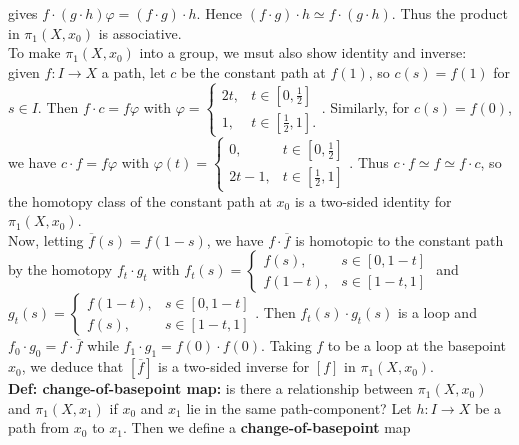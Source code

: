 \documentclass[a4paper]{article}
\begin{document}
gives $f \cdot \left( g\cdot h \right) \varphi
= \left( f\cdot g \right) \cdot h$.
Hence $(f\cdot g) \cdot h \simeq f\cdot \left( g\cdot h \right) $.
Thus the product in $\pi_1 (X,x_0)$ is associative.\\
To make $\pi_1 (X,x_0)$ into a group, we msut also show identity and inverse:\\
given $f  \colon I \to X$ a path, let $c$ be the constant path at
$f(1)$, so $c(s) = f(1)$ for $s \in I$. Then
$f \cdot c = f \varphi$ with $\varphi 
= \begin{cases}
    2t, & t \in \left[ 0,\frac{1}{2} \right] \\
    1, & t \in \left[ \frac{1}{2},1 \right].
\end{cases}$.
Similarly, for $c (s) = f(0)$, we have
$c \cdot f = f \varphi$ with
$\varphi (t) = \begin{cases}
    0, & t \in \left[ 0, \frac{1}{2} \right] \\
    2t - 1, & t \in \left[ \frac{1}{2},1 \right] 
\end{cases}$.
Thus $c \cdot f \simeq f \simeq f \cdot c$, so the homotopy class
of the constant path at $ x_0$ is a two-sided identity
for $\pi_1 \left( X, x_0 \right) $.\\
\linebreak
Now, letting $\overline{f}(s) = f(1-s)$, we have
$f \cdot \overline{f} $ is homotopic to the constant path by the homotopy
$f_t \cdot g_t$ with $f_{t}(s) = \begin{cases}
    f(s), & s \in \left[ 0, 1-t \right]\\
    f(1-t), & s \in \left[ 1-t, 1 \right] 
\end{cases}$
and
$g_t (s) = \begin{cases}
    f(1-t), & s \in \left[ 0, 1-t \right] \\
    f(s), & s \in \left[ 1-t,1 \right] 
\end{cases}$.
Then $f_t (s) \cdot  g_t (s) $ is a loop and
$f_0 \cdot g_0 = f \cdot \overline{f}$ while
$f_{1} \cdot g_{1} = f(0) \cdot f(0)$. 
Taking $f$ to be a loop at the basepoint $x_0$, we deduce
that $\left[ \overline{f} \right] $ is a two-sided inverse
for $\left[ f \right] $ in $\pi_1 \left( X, x_0 \right) $.\\
\linebreak
\textbf{Def: change-of-basepoint map:} is there a relationship between
$\pi_1 (X, x_0)$ and $\pi_1(X, x_1)$ if $x_0$ and $x_1$ lie in the same
path-component? Let $h  \colon I\to X$ be a path from $x_0$ to $x_1$. 
Then we define a \textbf{change-of-basepoint} map
\end{document}
